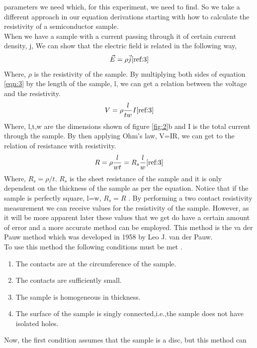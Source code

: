 \documentclass[twocolumn]{article}
\begin{document}
parameters we need which, for this experiment, we need to find. So we take a 
different approach in our equation derivations starting with how to calculate 
the resistivity of a semiconductor sample.
\\
When we have a sample with a current passing through it of certain current 
density, j, We can show that the electric field is related in the following way,
\begin{equation}
\vec{E} = \rho\vec{j}
\cite{ref:3}
\label{eqn:4}
\end{equation}
Where, $\rho$ is the resistivity of the sample. By multiplying both sides of 
equation \ref{eqn:3} by the length of the sample, l, we can get a relation 
between the voltage and the resistivity.
\begin{equation}
V = \rho\frac{l}{tw} I 
\cite{ref:3}
\label{eqn:5}
\end{equation}
Where, l,t,w are the dimensions shown of figure \ref{fig:2}b and I is the 
total current through the sample. By then applying Ohm's law, V=IR, we can get 
to the relation of resistance with resistivity.
\begin{equation}
R = \rho\frac{l}{wt} = R_s\frac{l}{w}
\cite{ref:3}
\label{eqn:6}
\end{equation}
Where, $R_s = \rho/t$. $R_s$ is the sheet resistance of the sample and it is 
only dependent on the thickness of the sample as per the equation. Notice that 
if the sample is perfectly square, l=w, $R_s = R$ \cite{ref:3}. By performing a 
two contact resistivity measurement we can receive values for the resistivity 
of the sample. However, as it will be more apparent later these values that we 
get do have a certain amount of error and a more accurate method can be 
employed. This method is the va der Pauw method which was developed in 1958 by 
Leo J. van der Pauw.
\\
To use this method the following conditions must be met \cite{ref:4}.
\begin{enumerate}[label=\alph*]
\item The contacts are at the circumference of the sample.
\item The contacts are sufficiently small.
\item The sample is homogeneous in thickness.
\item The surface of the sample is singly connected,i.e.,the sample does not 
have isolated holes.
\end{enumerate}
Now, the first condition assumes that the sample is a disc, but this method can 
\end{document}
